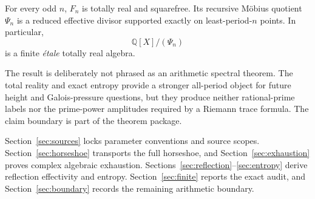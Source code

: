 \begin{corollary}
For every odd $n$, $F_n$ is totally real and squarefree.  Its recursive
M\"obius quotient $\Psi_n$ is a reduced effective divisor supported exactly
on least-period-$n$ points.  In particular,
\[
\mathbb Q[X]/(\Psi_n)
\]
is a finite \emph{\'etale} totally real algebra.
\end{corollary}

The result is deliberately not phrased as an arithmetic spectral theorem.
The total reality and exact entropy provide a stronger all-period object for
future height and Galois-pressure questions, but they produce neither
rational-prime labels nor the prime-power amplitudes required by a Riemann
trace formula.  The claim boundary is part of the theorem package.

Section~\ref{sec:sources} locks parameter conventions and source scopes.
Section~\ref{sec:horseshoe} transports the full horseshoe, and
Section~\ref{sec:exhaustion} proves complex algebraic exhaustion.
Sections~\ref{sec:reflection}--\ref{sec:entropy} derive reflection
effectivity and entropy.  Section~\ref{sec:finite} reports the exact audit,
and Section~\ref{sec:boundary} records the remaining arithmetic boundary.
